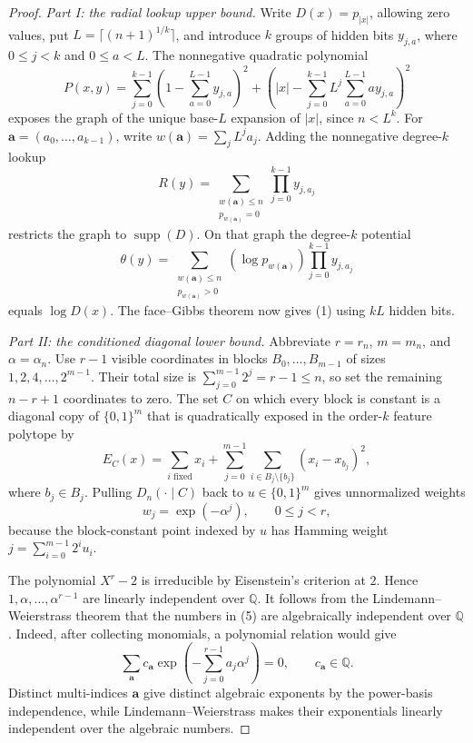 \documentclass{article}
\newcommand{\supp}{\operatorname{supp}}
\newcommand{\bits}{\{0,1\}}
\begin{document}
\begin{proof}
\emph{Part I: the radial lookup upper bound.}
Write $D(x)=p_{|x|}$, allowing zero values,
put $L=\lceil(n+1)^{1/k}\rceil$, and introduce $k$ groups of hidden bits
$y_{j,a}$, where $0\le j<k$ and $0\le a<L$.  The nonnegative quadratic
polynomial
\[
  P(x,y)=
  \sum_{j=0}^{k-1}\left(1-\sum_{a=0}^{L-1}y_{j,a}\right)^2
  +\left(
    |x|-\sum_{j=0}^{k-1}L^j\sum_{a=0}^{L-1}a y_{j,a}
  \right)^2
\]
exposes the graph of the unique base-$L$ expansion of $|x|$, since
$n<L^k$.  For $\mathbf a=(a_0,\ldots,a_{k-1})$, write
$w(\mathbf a)=\sum_jL^ja_j$.  Adding the nonnegative degree-$k$ lookup
\[
  R(y)=
  \sum_{\substack{w(\mathbf a)\le n\\p_{w(\mathbf a)}=0}}
  \prod_{j=0}^{k-1}y_{j,a_j}
\]
restricts the graph to $\supp(D)$.  On that graph the degree-$k$ potential
\[
  \theta(y)=
  \sum_{\substack{w(\mathbf a)\le n\\p_{w(\mathbf a)}>0}}
  (\log p_{w(\mathbf a)})
  \prod_{j=0}^{k-1}y_{j,a_j}
\]
equals $\log D(x)$.  The face--Gibbs theorem now gives (1) using $kL$ hidden
bits.

\emph{Part II: the conditioned diagonal lower bound.}
Abbreviate $r=r_n$, $m=m_n$, and $\alpha=\alpha_n$.
Use $r-1$ visible coordinates in blocks $B_0,\ldots,B_{m-1}$ of sizes
$1,2,4,\ldots,2^{m-1}$.  Their total size is
$\sum_{j=0}^{m-1}2^j=r-1\le n$, so set the remaining $n-r+1$ coordinates to
zero.  The set $C$ on which every block is constant is a diagonal copy of
$\bits^m$ that is quadratically exposed in the order-$k$ feature polytope by
\[
  E_C(x)=
  \sum_{i\text{ fixed}}x_i+
  \sum_{j=0}^{m-1}\sum_{i\in B_j\setminus\{b_j\}}
  (x_i-x_{b_j})^2,
\]
where $b_j\in B_j$.  Pulling $D_n(\mathord\cdot\mid C)$ back to
$u\in\bits^m$ gives unnormalized weights
\[
  w_j=\exp(-\alpha^j),
  \qquad 0\le j<r,
  \tag{5}
\]
because the block-constant point indexed by $u$ has Hamming weight
$j=\sum_{i=0}^{m-1}2^iu_i$.

The polynomial $X^r-2$ is irreducible by Eisenstein's criterion at $2$.
Hence $1,\alpha,\ldots,\alpha^{r-1}$ are linearly independent over
$\mathbb Q$.  It follows from the Lindemann--Weierstrass theorem that the
numbers in (5) are algebraically independent over $\mathbb Q$
\cite[Theorem~3.2]{popescu24}.  Indeed, after collecting monomials, a polynomial relation
would give
\[
  \sum_{\mathbf a}c_{\mathbf a}
  \exp\!\left(-\sum_{j=0}^{r-1}a_j\alpha^j\right)=0,
  \qquad c_{\mathbf a}\in\mathbb Q.
\]
Distinct multi-indices $\mathbf a$ give distinct algebraic exponents by the
power-basis independence, while Lindemann--Weierstrass makes their
exponentials linearly independent over the algebraic numbers.


\end{proof}
\end{document}
